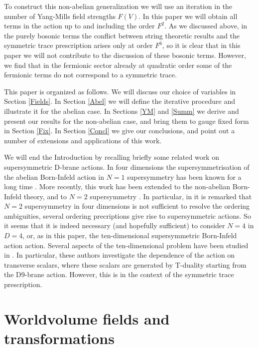 \documentclass[12pt,a4paper]{article}
\begin{document}
To construct this non-abelian generalization we
will use an iteration in the number of Yang-Mills field strengths
$F(V)$. In this paper
we will obtain all terms in the action up to and including the order $F^2$.
As we discussed
above, in the purely
bosonic terms the conflict between string theoretic
results and the symmetric trace prescription arises only at order
$F^6$, so it is clear that in this paper we will not
contribute to the discussion of these bosonic terms.
However, we find that in the fermionic sector already  at
quadratic order some of the fermionic terms
do not correspond to a symmetric trace.

This paper is organized as follows. We will discuss our choice of variables
in Section \ref{Fields}.
In Section \ref{Abel} we will define the iterative procedure and
illustrate it for the abelian case. In Sections \ref{YM}
and \ref{Summ} we derive and present our results
for the non-abelian case,
and bring them to gauge fixed form in Section \ref{Fix}.
In Section \ref{Concl}
we give our conclusions, and
point out a number of extensions and applications of this work.

We will end the Introduction by recalling briefly some
related work on supersymmetric D-brane actions. In four
dimensions the supersymmetrisation of the abelian Born-Infeld
action in $N=1$ supersymmetry has been known for a long time
\cite{CF}. More recently, this work has been extended
to the non-abelian Born-Infeld theory, and to $N=2$
supersymmetry \cite{K2,RTZ}. In particular, in \cite{K2} it
is remarked that $N=2$ supersymmetry in four dimensions is
not sufficient to resolve the ordering ambiguities, several
ordering precriptions give rise to supersymmetric actions.
So it seems that it is indeed necessary (and hopefully
sufficient) to consider $N=4$ in $D=4$, or, as in this
paper, the ten-dimensional supersymmetric Born-Infeld action
action. Several aspects of the ten-dimensional problem have
been studied in \cite{TR, M}. In particular, these authors
investigate the dependence of the action on transverse scalars,
where these scalars are generated by T-duality starting from the
D9-brane action. However, this is in the context of the symmetric
trace prescription.

\section{Worldvolume fields and transformations\label{Fields}}
\end{document}
